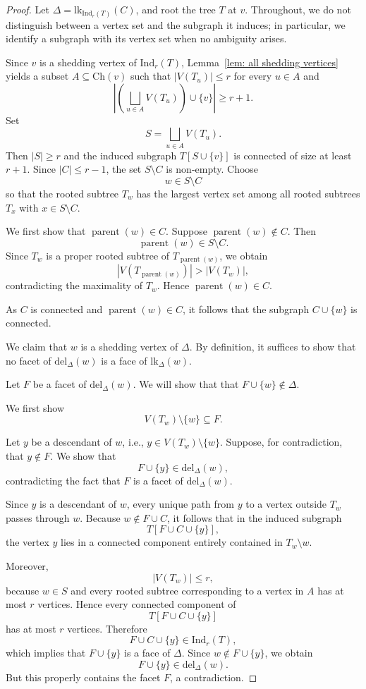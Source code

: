 \documentclass[10pt,a4paper]{amsart}
\def\Ch{\mathrm{Ch}}
\def\Ind{\mathrm{Ind}}
\def\del{\mathrm{del}}
\def\lk{\mathrm{lk}}
\begin{document}
\begin{proof}
Let $\Delta = \lk_{\Ind_r(T)}(C)$, and root the tree $T$ at $v$. Throughout, we do not distinguish between a vertex set and the subgraph it induces; in particular, we identify a subgraph with its vertex set when no ambiguity arises.

Since $v$ is a shedding vertex of $\Ind_r(T)$, Lemma~\ref{lem: all shedding vertices} yields a subset $A\subseteq \Ch(v)$ such that $|V(T_u)|\le r$ for every $u\in A$ and
\[
\left|\left(\bigsqcup_{u\in A}V(T_u)\right)\cup\{v\}\right|
\ge r+1.
\]
Set
\[
S=\bigsqcup_{u\in A}V(T_u).
\]
Then $|S|\ge r$ and the induced subgraph $T[S \cup \{v\}]$ is connected of size at least $r+1$. Since $|C|\le r-1$, the set $S\setminus C$ is non-empty. Choose
\[
w\in S\setminus C
\]
so that the rooted subtree \(T_w\) has the largest vertex set among all rooted subtrees \(T_x\) with \(x \in S \setminus C\).

We first show that $\operatorname{parent}(w)\in C$. Suppose $\operatorname{parent}(w) \notin C$. Then
\[
\operatorname{parent}(w)\in S\setminus C.
\]
Since $T_w$ is a proper rooted subtree of $T_{\operatorname{parent}(w)}$, we obtain
\[
|V(T_{\operatorname{parent}(w)})|
>
|V(T_w)|,
\]
contradicting the maximality of $T_w$. Hence $\operatorname{parent}(w)\in C$.

As $C$ is connected and $\operatorname{parent}(w)\in C$, it follows that the subgraph $C\cup\{w\}$ is connected.

We claim that \(w\) is a shedding vertex of \(\Delta\). By definition, it suffices to show that no facet of \(\del_\Delta(w)\) is a face of \(\lk_\Delta(w)\).

Let \(F\) be a facet of \(\del_\Delta(w)\). We will show that that $F\cup\{w\}\notin\Delta$.

We first show
\[
V(T_w)\setminus\{w\}\subseteq F.
\]

Let \(y\) be a descendant of \(w\), i.e., \(y \in V(T_w)\setminus\{w\}\). Suppose, for contradiction, that \(y\notin F\).
We show that
\[
F\cup\{y\}\in\del_\Delta(w),
\]
contradicting the fact that $F$ is a facet of $\del_{\Delta}(w)$.

Since \(y\) is a descendant of \(w\), every unique path from \(y\) to a vertex outside \(T_w\) passes through \(w\). Because $w\notin F\cup C$, it follows that in the induced subgraph
\[
T[F\cup C\cup\{y\}],
\]
the vertex \(y\) lies in a connected component entirely contained in \(T_w \setminus w\).

Moreover,
\[
|V(T_w)|\le r,
\]
because \(w\in S\) and every rooted subtree corresponding to a vertex in \(A\) has at most
\(r\) vertices. Hence every connected component of
\[
T[F\cup C\cup\{y\}]
\]
has at most \(r\) vertices. Therefore
\[
F\cup C\cup\{y\}\in\Ind_r(T),
\]
which implies that $F\cup\{y\}$ is a face of $\Delta$. Since $w\notin F\cup\{y\}$,
we obtain
\[
F\cup\{y\}\in\del_\Delta(w).
\]
But this properly contains the facet \(F\), a contradiction.


\end{proof}
\end{document}
